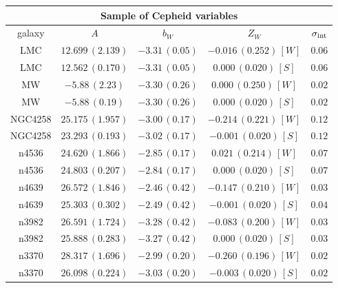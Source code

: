 \begin{table}[tbp]
\centering
\begin{tabular}{@{}ccccc}
\hline
\multicolumn{5}{c}{Sample of Cepheid variables} \\
\hline
galaxy & $A$ & $b_W$ & $Z_W$ & $\sigma_{\mathrm{int}}$ \\
\hline
 LMC & $12.699\,(2.139)$ & $-3.31\,(0.05)$ & $-0.016\,(0.252)\,[W]$ & $0.06$ \\

LMC & $12.562\,(0.170)$ & $-3.31\,(0.05)$ & $0.000\,(0.020)\,[S]$ & $0.06$ \\
  
 MW & $-5.88\,(2.23)$ & $-3.30\,(0.26)$ & $0.000\,(0.250)\,[W]$ & $0.02$ \\

 MW & $-5.88\,(0.19)$ & $-3.30\,(0.26)$ & $0.000\,(0.020)\,[S]$ & $0.02$ \\
 
 NGC4258 & $25.175\,(1.957)$ & $-3.00\,(0.17)$ & $-0.214\,(0.221)\,[W]$& $0.12$ \\

 NGC4258 & $23.293\,(0.193)$ & $-3.02\,(0.17)$ & $-0.001\,(0.020)\,[S]$& $0.12$ \\
 
 n4536 & $24.620\,(1.866)$ & $-2.85\,(0.17)$ & $ 0.021\,(0.214)\,[W]$ & $0.07$ \\

 n4536 & $24.803\,(0.207)$ & $-2.84\,(0.17)$ & $ 0.000\,(0.020)\,[S]$ & $0.07$ \\
 
 n4639 & $26.572\,(1.846)$ & $-2.46\,(0.42)$ & $-0.147\,(0.210)\,[W]$ & $0.03$ \\
 
 n4639 & $25.303\,(0.302)$ & $-2.49\,(0.42)$ & $-0.001\,(0.020)\,[S]$ & $0.04$ \\
  
 n3982 & $26.591\,(1.724)$ & $-3.28\,(0.42)$ & $-0.083\,(0.200)\,[W]$ & $0.03$ \\
  
 n3982 & $25.888\,(0.283)$ & $-3.27\,(0.42)$ & $ 0.000\,(0.020)\,[S]$ & $0.03$ \\
   
 n3370 & $28.317\,(1.696)$ & $-2.99\,(0.20)$ & $-0.260\,(0.196)\,[W]$ & $0.02$ \\
 
 n3370 & $26.098\,(0.224)$ & $-3.03\,(0.20)$ & $-0.003\,(0.020)\,[S]$ & $0.02$ \\
  

\end{tabular}
\end{table}
